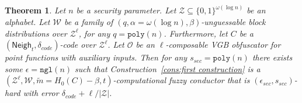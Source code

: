 \documentclass[11pt]{article}
\newcommand{\consref}[1]{\mbox{Construction~\ref{#1}}}
\newcommand{\class}[1]{{\ensuremath{\mathsf{#1}}}}
\newcommand{\zo}{\ensuremath{\{0, 1\}}}
\newcommand{\neigh}{\ensuremath{\class{Neigh}}\xspace}
\newcommand{\poly}{\ensuremath{\mathtt{poly}}\xspace}
\newcommand{\ngl}{\ensuremath{\mathtt{ngl}}\xspace}
\newtheorem{theorem}{Theorem}[section]
\begin{document}
\begin{theorem}
\label{thm:main thm first cons}
Let $n$ be a security parameter. Let $\mathcal{Z}\subseteq \zo^{\omega(\log n)}$ be an alphabet.
Let $\mathcal{W}$ be a family of $(q,\alpha= \omega(\log n),  \beta)$-unguessable block distributions over $\mathcal{Z}^\ell$, for any $q = \poly(n)$.  Furthermore, let $C$ be a $(\neigh_t, \delta_{code})$-code over $\mathcal{Z}^\ell$.  Let $\mathcal{O}$ be an $\ell$-composable VGB obfuscator for point functions with auxiliary inputs. Then for any $s_{sec} = \poly(n)$ there exists some $\epsilon=\ngl(n)$ such that \consref{cons:first construction} is a $(\mathcal{Z}^\ell, \mathcal{W}, \tilde{m}=H_0(C)-\beta, t)$-computational fuzzy conductor that is $(\epsilon_{sec}, s_{sec})$-hard with error $\delta_{code} + \ell/|\mathcal{Z}|$.
\end{theorem}
\end{document}
